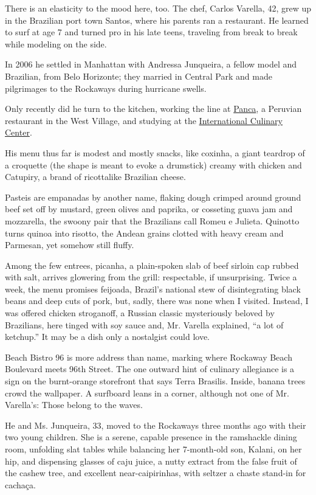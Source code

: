 There is an elasticity to the mood here, too. The chef, Carlos Varella,
42, grew up in the Brazilian port town Santos, where his parents ran a
restaurant. He learned to surf at age 7 and turned pro in his late
teens, traveling from break to break while modeling on the side.

In 2006 he settled in Manhattan with Andressa Junqueira, a fellow model
and Brazilian, from Belo Horizonte; they married in Central Park and
made pilgrimages to the Rockaways during hurricane swells.

Only recently did he turn to the kitchen, working the line at
\href{http://www.pancany.com/\#happy-hour}{Panca}, a Peruvian restaurant
in the West Village, and studying at the
\href{http://www.internationalculinarycenter.com/}{International
Culinary Center}.

His menu thus far is modest and mostly snacks, like coxinha, a giant
teardrop of a croquette (the shape is meant to evoke a drumstick) creamy
with chicken and Catupiry, a brand of ricottalike Brazilian cheese.

Pasteis are empanadas by another name, flaking dough crimped around
ground beef set off by mustard, green olives and paprika, or cosseting
guava jam and mozzarella, the swoony pair that the Brazilians call Romeu
e Julieta. Quinotto turns quinoa into risotto, the Andean grains clotted
with heavy cream and Parmesan, yet somehow still fluffy.

Among the few entrees, picanha, a plain-spoken slab of beef sirloin cap
rubbed with salt, arrives glowering from the grill: respectable, if
unsurprising. Twice a week, the menu promises feijoada, Brazil's
national stew of disintegrating black beans and deep cuts of pork, but,
sadly, there was none when I visited. Instead, I was offered chicken
stroganoff, a Russian classic mysteriously beloved by Brazilians, here
tinged with soy sauce and, Mr. Varella explained, ``a lot of ketchup.''
It may be a dish only a nostalgist could love.

Beach Bistro 96 is more address than name, marking where Rockaway Beach
Boulevard meets 96th Street. The one outward hint of culinary allegiance
is a sign on the burnt-orange storefront that says Terra Brasilis.
Inside, banana trees crowd the wallpaper. A surfboard leans in a corner,
although not one of Mr. Varella's: Those belong to the waves.

He and Ms. Junqueira, 33, moved to the Rockaways three months ago with
their two young children. She is a serene, capable presence in the
ramshackle dining room, unfolding slat tables while balancing her
7-month-old son, Kalani, on her hip, and dispensing glasses of caju
juice, a nutty extract from the false fruit of the cashew tree, and
excellent near-caipirinhas, with seltzer a chaste stand-in for cachaça.


